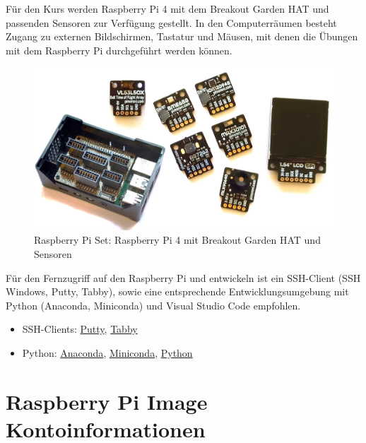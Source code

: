 \documentclass[
  11pt,
  a4paperpaper,
  oneside, openany  ,captions=tableheading
]{scrbook}
\providecommand{\tightlist}{%
  \setlength{\itemsep}{0pt}\setlength{\parskip}{0pt}}
\theoremstyle{definition}
\theoremstyle{remark}
\renewcommand{\markright}[1]{\def\chaptertitle{#1}} %
\begin{document}
\markright{Kursvorbereitung}

Für den Kurs werden Raspberry Pi 4 mit dem Breakout Garden HAT und
passenden Sensoren zur Verfügung gestellt. In den Computerräumen besteht
Zugang zu externen Bildschirmen, Tastatur und Mäusen, mit denen die
Übungen mit dem Raspberry Pi durchgeführt werden können.

\begin{figure}[H]

{\centering \includegraphics{images/raspberry_pi_set.jpg}

}

\caption{Raspberry Pi Set: Raspberry Pi 4 mit Breakout Garden HAT und
Sensoren}

\end{figure}%

Für den Fernzugriff auf den Raspberry Pi und entwickeln ist ein
SSH-Client (SSH Windows, Putty, Tabby), sowie eine entsprechende
Entwicklungsumgebung mit Python (Anaconda, Miniconda) und Visual Studio
Code empfohlen.

\begin{itemize}
\tightlist
\item
  SSH-Clients: \href{https://www.putty.org}{Putty},
  \href{https://tabby.sh/}{Tabby}
\item
  Python: \href{https://www.anaconda.com/download}{Anaconda},
  \href{https://docs.conda.io/projects/miniconda/en/latest/}{Miniconda},
  \href{https://www.python.org/}{Python}
\end{itemize}

\section*{Raspberry Pi Image
Kontoinformationen}\label{raspberry-pi-image-kontoinformationen}
\end{document}
